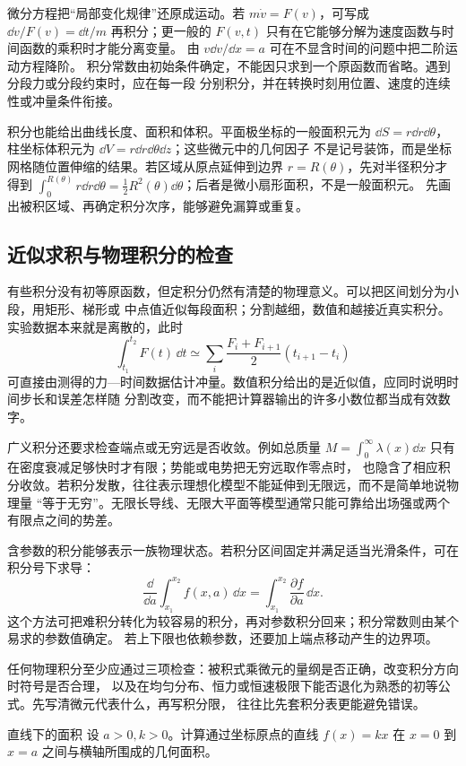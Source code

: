 {微分方程把“局部变化规律”还原成运动。若 $m\dot v=F(v)$，可写成
$\dd v/F(v)=\dd t/m$ 再积分；更一般的 $F(v,t)$ 只有在它能够分解为速度函数与时间函数的乘积时才能分离变量。
由 $v\dd v/\dd x=a$ 可在不显含时间的问题中把二阶运动方程降阶。
积分常数由初始条件确定，不能因只求到一个原函数而省略。遇到分段力或分段约束时，应在每一段
分别积分，并在转换时刻用位置、速度的连续性或冲量条件衔接。

积分也能给出曲线长度、面积和体积。平面极坐标的一般面积元为
$\dd S=r\dd r\dd\theta$，柱坐标体积元为 $\dd V=r\dd r\dd\theta\dd z$；这些微元中的几何因子
不是记号装饰，而是坐标网格随位置伸缩的结果。若区域从原点延伸到边界 $r=R(\theta)$，先对半径积分才得到
$\int_0^{R(\theta)}r\dd r\dd\theta=\tfrac12R^2(\theta)\dd\theta$；后者是微小扇形面积，不是一般面积元。
先画出被积区域、再确定积分次序，能够避免漏算或重复。

\subsection{近似求积与物理积分的检查}

有些积分没有初等原函数，但定积分仍然有清楚的物理意义。可以把区间划分为小段，用矩形、梯形或
中点值近似每段面积；分割越细，数值和越接近真实积分。实验数据本来就是离散的，此时
\[
 \int_{t_1}^{t_2}F(t)\,\dd t
 \simeq\sum_i\frac{F_i+F_{i+1}}2(t_{i+1}-t_i)
\]
可直接由测得的力—时间数据估计冲量。数值积分给出的是近似值，应同时说明时间步长和误差怎样随
分割改变，而不能把计算器输出的许多小数位都当成有效数字。

广义积分还要求检查端点或无穷远是否收敛。例如总质量
$M=\int_0^\infty\lambda(x)\dd x$ 只有在密度衰减足够快时才有限；势能或电势把无穷远取作零点时，
也隐含了相应积分收敛。若积分发散，往往表示理想化模型不能延伸到无限远，而不是简单地说物理量
“等于无穷”。无限长导线、无限大平面等模型通常只能可靠给出场强或两个有限点之间的势差。

含参数的积分能够表示一族物理状态。若积分区间固定并满足适当光滑条件，可在积分号下求导：
\[
 \frac{\dd}{\dd a}\int_{x_1}^{x_2}f(x,a)\,\dd x
 =\int_{x_1}^{x_2}\frac{\partial f}{\partial a}\,\dd x.
\]
这个方法可把难积分转化为较容易的积分，再对参数积分回来；积分常数则由某个易求的参数值确定。
若上下限也依赖参数，还要加上端点移动产生的边界项。

任何物理积分至少应通过三项检查：被积式乘微元的量纲是否正确，改变积分方向时符号是否合理，
以及在均匀分布、恒力或恒速极限下能否退化为熟悉的初等公式。先写清微元代表什么，再写积分限，
往往比先套积分表更能避免错误。


\begin{origexamplebox}{直线下的面积}\label{ch01:ex:s15-1-17}
设 $a>0,k>0$。计算通过坐标原点的直线 $f(x)=kx$ 在 $x=0$ 到 $x=a$ 之间与横轴所围成的几何面积。
\end{origexamplebox}

}
